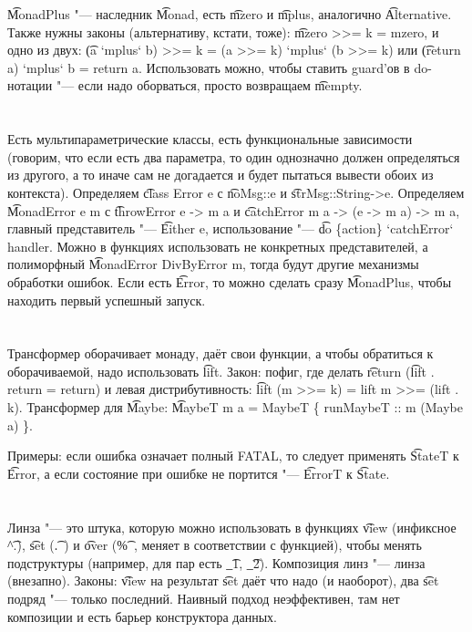 \t{MonadPlus} "--- наследник \t{Monad}, есть \t{mzero} и \t{mplus}, аналогично \t{Alternative}.
Также нужны законы (альтернативу, кстати, тоже): \t{mzero >>= k = mzero}, и одно из двух:
\t{(a `mplus` b) >>= k = (a >>= k) `mplus` (b >>= k)} или \t{(return a) `mplus` b = return a}.
Использовать можно, чтобы ставить guard'ов в do-нотации "--- если надо оборваться, просто возвращаем \t{mempty}.

\section{} %
Есть мультипараметрические классы, есть функциональные зависимости (говорим, что если есть два параметра, то один однозначно
должен определяться из другого, а то иначе сам не догадается и будет пытаться вывести обоих из контекста).
Определяем \t{class Error e} с \t{noMsg::e} и \t{strMsg::String->e}.
Определяем \t{MonadError e m} с \t{throwError e -> m a} и \t{catchError m a -> (e -> m a) -> m a},
главный представитель "--- \t{Either e}, использование "--- \t{do \{action\} `catchError` handler}.
Можно в функциях использовать не конкретных представителей, а полиморфный \t{MonadError DivByError m}, тогда
будут другие механизмы обработки ошибок.
Если есть \t{Error}, то можно сделать сразу \t{MonadPlus}, чтобы находить первый успешный запуск.

\section{} %
Трансформер оборачивает монаду, даёт свои функции, а чтобы обратиться к оборачиваемой, надо использовать \t{lift}.
Закон: пофиг, где делать \t{return} (\t{lift . return = return}) и левая дистрибутивность: \t{lift (m >>= k) = lift m >>= (lift . k)}.
Трансформер для \t{Maybe}: \t{MaybeT m a = MaybeT \{ runMaybeT :: m (Maybe a) \}}.

Примеры: если ошибка означает полный FATAL, то следует применять \t{StateT} к \t{Error},
а если состояние при ошибке не портится "--- \t{ErrorT} к \t{State}.

\section{} %
Линза "--- это штука, которую можно использовать в функциях \t{view} (инфиксное \t{^.}),
\t{set} (\t{.~}) и \t{over} (\t{\%~}, меняет в соответствии с функцией), чтобы менять
подструктуры (например, для пар есть \t{\_1}, \t{\_2}).
Композиция линз "--- линза (внезапно).
Законы: \t{view} на результат \t{set} даёт что надо (и наоборот), два \t{set} подряд "--- только последний.
Наивный подход неэффективен, там нет композиции и есть барьер конструктора данных.

